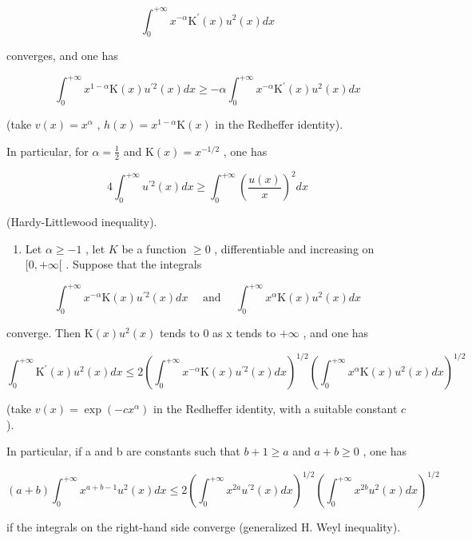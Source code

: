 \[
\int_ {0} ^ {+ \infty} x ^ {- \alpha} \mathrm{K} ^ {\prime} (x) u ^ {2} (x) d x
\]

converges, and one has

\[
\int_ {0} ^ {+ \infty} x ^ {1 - \alpha} \mathrm{K} (x) u ^ {\prime 2} (x) d x \geqslant - \alpha \int_ {0} ^ {+ \infty} x ^ {- \alpha} \mathrm{K} ^ {\prime} (x) u ^ {2} (x) d x
\]

(take \(v(x) = x^{\alpha}\) , \(h(x) = x^{1 - \alpha}\mathrm{K}(x)\) in the Redheffer identity).

In particular, for \(\alpha = \frac{1}{2}\) and \(\mathrm{K}(x) = x^{-1 / 2}\) , one has

\[
4 \int_ {0} ^ {+ \infty} u ^ {\prime 2} (x) d x \geqslant \int_ {0} ^ {+ \infty} \left(\frac {u (x)}{x}\right) ^ {2} d x
\]

(Hardy-Littlewood inequality).

\begin{enumerate}
\def\labelenumi{\alph{enumi})}
\setcounter{enumi}{4}
\tightlist
\item
  Let \(\alpha \geqslant -1\) , let \(K\) be a function \(\geqslant 0\) , differentiable and increasing on \([0, +\infty[\) . Suppose that the integrals
\end{enumerate}

\[
\int_ {0} ^ {+ \infty} x ^ {- \alpha} \mathrm{K} (x) u ^ {\prime 2} (x) d x \quad \text { and } \quad \int_ {0} ^ {+ \infty} x ^ {\alpha} \mathrm{K} (x) u ^ {2} (x) d x
\]

converge. Then \(\mathrm{K}(x)u^{2}(x)\) tends to 0 as x tends to \(+\infty\) , and one has

\[
\int_ {0} ^ {+ \infty} \mathrm{K} ^ {\prime} (x) u ^ {2} (x) d x \leqslant 2 \left(\int_ {0} ^ {+ \infty} x ^ {- \alpha} \mathrm{K} (x) u ^ {\prime 2} (x) d x\right) ^ {1 / 2} \left(\int_ {0} ^ {+ \infty} x ^ {\alpha} \mathrm{K} (x) u ^ {2} (x) d x\right) ^ {1 / 2}
\]

(take \(v(x) = \exp(-cx^{\alpha})\) in the Redheffer identity, with a suitable constant \(c\) ).

In particular, if a and b are constants such that \(b + 1 \geqslant a\) and \(a + b \geqslant 0\) , one has

\[
(a + b) \int_ {0} ^ {+ \infty} x ^ {a + b - 1} u ^ {2} (x) d x \leqslant 2 \left(\int_ {0} ^ {+ \infty} x ^ {2 a} u ^ {\prime 2} (x) d x\right) ^ {1 / 2} \left(\int_ {0} ^ {+ \infty} x ^ {2 b} u ^ {2} (x) d x\right) ^ {1 / 2}
\]

if the integrals on the right-hand side converge (generalized H. Weyl inequality).

